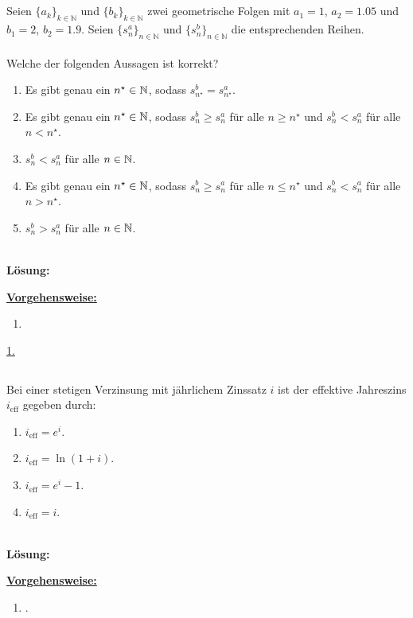 \subsection*{}
Seien $\{a_k\}_{k \in \mathbb{N}}$ und $\{b_k\}_{k \in \mathbb{N}}$ zwei geometrische Folgen mit $a_1 = 1$, $a_2= 1.05$ und $b_1 = 2$, $b_2 = 1.9$. Seien $\{s_n^a \}_{n \in \mathbb{N}}$ und $\{s_n^b \}_{n \in \mathbb{N}}$ die entsprechenden Reihen.\\
\\
Welche der folgenden Aussagen ist korrekt?
\renewcommand{\labelenumi}{(\alph{enumi})}
\begin{enumerate}
	\item 
	Es gibt genau ein $n^\star \in \mathbb{N}$, sodass $s^b_{n^\star} = s^a_{n^\star} $.
	\item 
	Es gibt genau ein $n^\star \in \mathbb{N}$, sodass $s^b_n \geq s_n^a$ für alle $n \geq n^\star$ und $s_n^b < s_n^a$ für alle $n < n^\star$.
	\item 
	$s_n^b < s_n^a$ für alle $n \in \mathbb{N}$.
	\item
	Es gibt genau ein $n^\star \in \mathbb{N}$, sodass $s_n^b \geq s_n^a$ für alle $n \leq n^\star$ und $s_n^b < s_n^a$ für alle $n > n^\star$.
	\item 
	$s_n^b > s_n^a$ für alle $n \in \mathbb{N}$.
\end{enumerate}
\ \\
\textbf{Lösung:}
\begin{mdframed}
\underline{\textbf{Vorgehensweise:}}
\renewcommand{\labelenumi}{\theenumi.}
\begin{enumerate}
\item 
\end{enumerate}
\end{mdframed}

\underline{1. }\\




\newpage

\subsection*{}
Bei einer stetigen Verzinsung mit jährlichem Zinssatz $i$ ist der effektive Jahreszins $i_{\mathrm{eff}}$ gegeben durch:
\renewcommand{\labelenumi}{(\alph{enumi})}
\begin{enumerate}
	\item 
	$i_{\mathrm{eff}} = e^i$.
	\item
	$i_{\mathrm{eff}} = \ln(1+ i)$.
	\item
	$i_{\mathrm{eff}} = e^i -1$.
	\item
	$i_{\mathrm{eff}} = i$.
\end{enumerate}
\ \\
\textbf{Lösung:}
\begin{mdframed}
\underline{\textbf{Vorgehensweise:}}
\renewcommand{\labelenumi}{\theenumi.}
\begin{enumerate}
\item .
\end{enumerate}
\end{mdframed}

